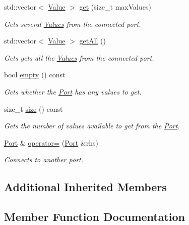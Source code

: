 \begin{DoxyCompactItemize}
std\+::vector$<$ \hyperlink{classdg_1_1deepcore_1_1_value}{Value} $>$ \hyperlink{classdg_1_1deepcore_1_1_port_a766d5bf9b79606d164b5ce837eff7792}{get} (size\+\_\+t max\+Values)
\begin{DoxyCompactList}\small\item\em Gets several \hyperlink{classdg_1_1deepcore_1_1_value}{Values} from the connected port. \end{DoxyCompactList}\item 
std\+::vector$<$ \hyperlink{classdg_1_1deepcore_1_1_value}{Value} $>$ \hyperlink{classdg_1_1deepcore_1_1_port_a648ffa51d73e5627b3b15d19cb3e22e2}{get\+All} ()
\begin{DoxyCompactList}\small\item\em Gets gets all the \hyperlink{classdg_1_1deepcore_1_1_value}{Values} from the connected port. \end{DoxyCompactList}\item 
bool \hyperlink{classdg_1_1deepcore_1_1_port_a8f8fc78511693f0453db49d7a2c79c0e}{empty} () const 
\begin{DoxyCompactList}\small\item\em Gets whether the \hyperlink{classdg_1_1deepcore_1_1_port}{Port} has any values to get. \end{DoxyCompactList}\item 
size\+\_\+t \hyperlink{classdg_1_1deepcore_1_1_port_a99beeaf672cdabc808e591707595c568}{size} () const 
\begin{DoxyCompactList}\small\item\em Gets the number of values available to get from the \hyperlink{classdg_1_1deepcore_1_1_port}{Port}. \end{DoxyCompactList}\item 
\hyperlink{classdg_1_1deepcore_1_1_port}{Port} \& \hyperlink{classdg_1_1deepcore_1_1_port_a7f1939dbfe1041d13229ee54164d373b}{operator=} (\hyperlink{classdg_1_1deepcore_1_1_port}{Port} \&rhs)
\begin{DoxyCompactList}\small\item\em Connects to another port. \end{DoxyCompactList}\end{DoxyCompactItemize}
\subsection*{Additional Inherited Members}


\subsection{Member Function Documentation}
